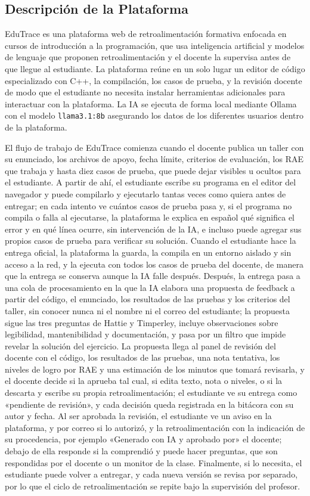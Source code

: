 \documentclass[letterpaper, 10 pt, conference]{ieeeconf}
\begin{document}
\subsection{Descripción de la Plataforma}
EduTrace es una plataforma web de retroalimentación formativa enfocada en cursos de introducción a la programación, que usa inteligencia artificial y modelos de lenguaje 
que proponen retroalimentación y el docente la supervisa antes de que llegue al estudiante. La plataforma reúne en un solo lugar un editor de código especializado con C++, la compilación, los casos de prueba, y la revisión docente de modo que el estudiante no necesita instalar herramientas adicionales para interactuar con la plataforma. 
La IA se ejecuta de forma local mediante Ollama con el modelo \texttt{llama3.1:8b} asegurando los datos de los diferentes usuarios dentro de la plataforma.

El flujo de trabajo de EduTrace comienza cuando el docente publica un taller con su enunciado, los archivos de apoyo, fecha límite, criterios de evaluación, los RAE que trabaja y hasta diez casos de prueba, que puede dejar visibles u ocultos para el estudiante.
A partir de ahí, el estudiante escribe su programa en el editor del navegador y puede compilarlo y ejecutarlo tantas veces como quiera antes de entregar; en cada intento ve cuántos casos de prueba pasa y, si el programa no compila o falla al ejecutarse, la plataforma le explica en español qué significa el error y en qué línea ocurre, sin intervención de la IA, e incluso puede agregar sus propios casos de prueba para verificar su solución.
Cuando el estudiante hace la entrega oficial, la plataforma la guarda, la compila en un entorno aislado y sin acceso a la red, y la ejecuta con todos los casos de prueba del docente, de manera que la entrega se conserva aunque la IA falle después.
Después, la entrega pasa a una cola de procesamiento en la que la IA elabora una propuesta de feedback a partir del código, el enunciado, los resultados de las pruebas y los criterios del taller, sin conocer nunca ni el nombre ni el correo del estudiante; la propuesta sigue las tres preguntas de Hattie y Timperley, incluye observaciones sobre legibilidad, mantenibilidad y documentación, y pasa por un filtro que impide revelar la solución del ejercicio.
La propuesta llega al panel de revisión del docente con el código, los resultados de las pruebas, una nota tentativa, los niveles de logro por RAE y una estimación de los minutos que tomará revisarla, y el docente decide si la aprueba tal cual, si edita texto, nota o niveles, o si la descarta y escribe su propia retroalimentación; el estudiante ve su entrega como «pendiente de revisión», y cada decisión queda registrada en la bitácora con su autor y fecha.
Al ser aprobada la revisión, el estudiante ve un aviso en la plataforma, y por correo si lo autorizó, y la retroalimentación con la indicación de su procedencia, por ejemplo «Generado con IA y aprobado por» el docente; debajo de ella responde si la comprendió y puede hacer preguntas, que son respondidas por el docente o un monitor de la clase.
Finalmente, si lo necesita, el estudiante puede volver a entregar, y cada nueva versión se revisa por separado, por lo que el ciclo de retroalimentación se repite bajo la supervisión del profesor.
\end{document}
